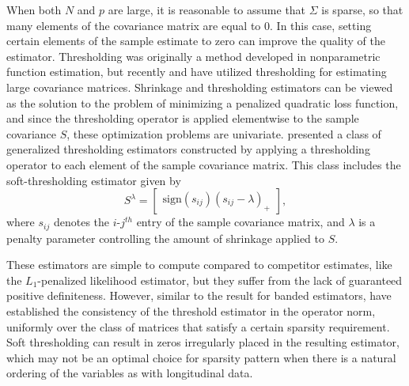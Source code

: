 When both $N$ and $p$ are large, it is reasonable to assume that $\Sigma$ is sparse, so that many elements of the covariance matrix are equal to 0. In this case, setting certain elements of the sample estimate to zero can improve the quality of the estimator. Thresholding was originally a method developed in nonparametric function estimation, but recently \cite{bickel2008covariance} and \cite{rothman2009generalized} have utilized thresholding for estimating large covariance matrices.  Shrinkage and thresholding estimators can be viewed as the solution to the problem of minimizing a penalized quadratic loss function, and since the thresholding operator is applied elementwise to the sample covariance $S$,  these optimization problems are univariate. \cite{rothman2009generalized} presented a class of generalized thresholding estimators constructed by applying a thresholding operator to each element of the sample covariance matrix. This class includes the soft-thresholding estimator given by
\[
S^{\lambda}=   \begin{bmatrix} \mbox{sign}\left(s_{ij}\right) \left(s_{ij} - \lambda\right)_+ \end{bmatrix},
\]
\noindent 
where $s_{ij}$ denotes the $i$-$j^{th}$ entry of the sample covariance matrix, and $\lambda$ is a penalty parameter controlling the amount of shrinkage applied to $S$. 

These estimators are simple to compute compared to competitor estimates, like the $L_1$-penalized likelihood estimator, but they suffer from the lack of guaranteed positive definiteness. However, similar to the result for banded estimators, \cite{bickel2008covariance} have established the consistency of the threshold estimator in the operator norm, uniformly over the class of matrices that satisfy a certain sparsity requirement. Soft thresholding can result in zeros irregularly placed in the resulting estimator, which may not be an optimal choice for sparsity pattern when there is a natural ordering of the variables as with longitudinal data.

